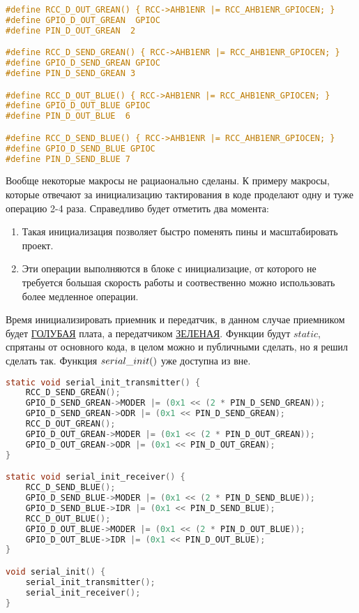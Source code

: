 \documentclass{bmstu}
\begin{document}
	\begingroup
	\fontsize{12pt}{12pt}\selectfont
	\begin{lstlisting}[language=C, name=serial_transmission_h]
#define RCC_D_OUT_GREAN() { RCC->AHB1ENR |= RCC_AHB1ENR_GPIOCEN; }
#define GPIO_D_OUT_GREAN  GPIOC
#define PIN_D_OUT_GREAN  2

#define RCC_D_SEND_GREAN() { RCC->AHB1ENR |= RCC_AHB1ENR_GPIOCEN; }
#define GPIO_D_SEND_GREAN GPIOC
#define PIN_D_SEND_GREAN 3

#define RCC_D_OUT_BLUE() { RCC->AHB1ENR |= RCC_AHB1ENR_GPIOCEN; }
#define GPIO_D_OUT_BLUE GPIOC
#define PIN_D_OUT_BLUE  6

#define RCC_D_SEND_BLUE() { RCC->AHB1ENR |= RCC_AHB1ENR_GPIOCEN; }
#define GPIO_D_SEND_BLUE GPIOC
#define PIN_D_SEND_BLUE 7
	\end{lstlisting}
	\endgroup
	
	Вообще некоторые макросы не рациаонально сделаны. К примеру макросы, которые отвечают за инициализацию тактирования в коде проделают одну и туже операцию 2-4 раза. Справедливо будет отметить два момента:

	\begin{enumerate}
		\item Такая инициализация позволяет быстро поменять пины и масштабировать проект.
		\item Эти операции выполняются в блоке с инициализацие, от которого не требуется большая скорость работы и соотвественно можно использовать более медленное операции.
	\end{enumerate}

	Время инициализировать приемник и передатчик, в данном случае приемником будет \underline{ГОЛУБАЯ} плата, а передатчиком \underline{ЗЕЛЕНАЯ}. 
	Функции будут $static$, спрятаны от основного кода, в целом можно и публичными сделать, но я решил сделать так. Функция $serial\text{\textunderscore}init()$ уже доступна из вне.
	
	\begingroup
	\fontsize{12pt}{12pt}\selectfont
	\begin{lstlisting}[language=C, name=serial_transmission_c]
static void serial_init_transmitter() {
	RCC_D_SEND_GREAN();
	GPIO_D_SEND_GREAN->MODER |= (0x1 << (2 * PIN_D_SEND_GREAN));
	GPIO_D_SEND_GREAN->ODR |= (0x1 << PIN_D_SEND_GREAN);
	RCC_D_OUT_GREAN();
	GPIO_D_OUT_GREAN->MODER |= (0x1 << (2 * PIN_D_OUT_GREAN));
	GPIO_D_OUT_GREAN->ODR |= (0x1 << PIN_D_OUT_GREAN);
}

static void serial_init_receiver() {
	RCC_D_SEND_BLUE();
	GPIO_D_SEND_BLUE->MODER |= (0x1 << (2 * PIN_D_SEND_BLUE));
	GPIO_D_SEND_BLUE->IDR |= (0x1 << PIN_D_SEND_BLUE);
	RCC_D_OUT_BLUE();
	GPIO_D_OUT_BLUE->MODER |= (0x1 << (2 * PIN_D_OUT_BLUE));
	GPIO_D_OUT_BLUE->IDR |= (0x1 << PIN_D_OUT_BLUE);
}

void serial_init() {
	serial_init_transmitter();
	serial_init_receiver();
}
	\end{lstlisting}
	\endgroup
	 
\end{document}
